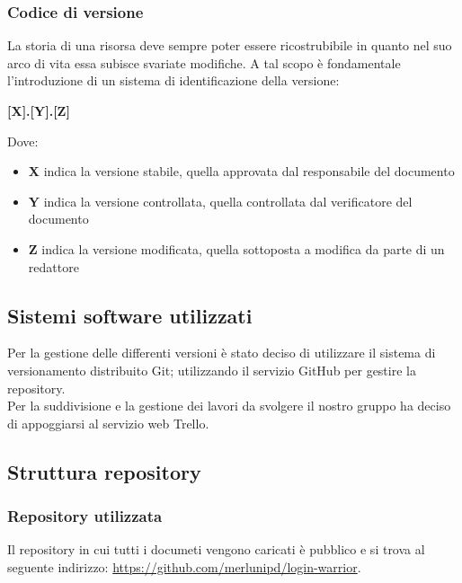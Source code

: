    \subsubsection{Codice di versione}
   La storia di una risorsa deve sempre poter essere ricostrubibile in quanto nel suo arco di vita essa subisce
   svariate modifiche. A tal scopo è fondamentale l'introduzione di un sistema di identificazione della 
   versione: 
   \begin{center}
       \textbf{[X].[Y].[Z]}
   \end{center}
   Dove:
   \begin{itemize}
       \item \textbf{X} indica la versione stabile, quella approvata dal responsabile del documento
       \item \textbf{Y} indica la versione controllata, quella controllata dal verificatore del documento
       \item \textbf{Z} indica la versione modificata, quella sottoposta a modifica da parte di un redattore
   \end{itemize}


 \subsection{Sistemi software utilizzati}
 Per la gestione delle differenti versioni è stato deciso di utilizzare il sistema
 di versionamento distribuito Git; utilizzando il servizio GitHub per gestire la repository.\\
 Per la suddivisione e la gestione dei lavori da svolgere il nostro gruppo ha deciso di appoggiarsi
 al servizio web Trello.\\

 \subsection{Struttura repository}
  \subsubsection{Repository utilizzata}
  Il repository in cui tutti i documeti vengono caricati è pubblico e si trova al seguente indirizzo: 
  \url{https://github.com/merlunipd/login-warrior}.

